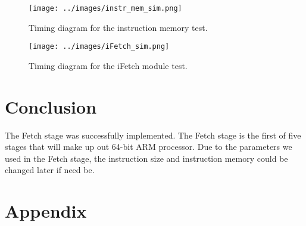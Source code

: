 \documentclass{article}
\newcommand{\Verilog}[3]{
  \lstset{language=Verilog}
  \lstset{backgroundcolor=\color{listinggray},rulecolor=\color{blue}}
  \lstset{linewidth=\textwidth}
  \lstset{commentstyle=\textit, stringstyle=\upshape,showspaces=false}
  \lstset{frame=tb}
  
}
\begin{document}
%
%
%
%
\begin{figure}
\begin{center}
\caption{Timing diagram for the instruction memory test.}\label{fig:instrsim}
\texttt{[image: ../images/instr\_mem\_sim.png]}
\end{center}
\end{figure}

\begin{figure}
\begin{center}
	\caption{Timing diagram for the iFetch module test.}\label{fig:ifetchsim}
	\texttt{[image: ../images/iFetch\_sim.png]}
\end{center}
\end{figure}

\section{Conclusion}
The Fetch stage was successfully implemented. The Fetch stage is the first of five stages that will make up out 64-bit ARM processor. Due to the parameters we used in the Fetch stage, the instruction size and instruction memory could be changed later if need be. 

\section{Appendix}
\end{document}
